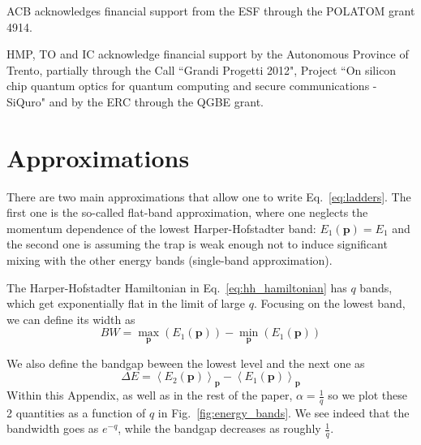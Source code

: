 \documentclass[twocolumn, 10pt, aps, superscriptaddress, floatfix, showpacs, pra, citeautoscript]{revtex4-1}
\newcommand{\vt}[1]{\mathbf{#1}}
\newcommand{\co}[2]{#2}
\renewcommand{\paragraph}{\co}
\begin{document}
\acknowledgments

ACB acknowledges financial support from the ESF through the POLATOM grant 4914.

HMP, TO and IC acknowledge financial support by the Autonomous Province of Trento, partially through the Call ``Grandi Progetti 2012", Project ``On silicon chip quantum optics for quantum computing and secure communications - SiQuro" and by the ERC through the QGBE grant.





\appendix

\section{Approximations}\label{app:approximations}


\paragraph{There are two main approximations in Hannah's paper.}
There are two main approximations that allow one to write
Eq.~\eqref{eq:ladders}. The first one is the so-called flat-band
approximation, where one neglects the momentum dependence of the
lowest Harper-Hofstadter band: $E_1(\vt{p}) = E_1$ and the second one is
assuming the trap is weak enough not to induce significant mixing with
the other energy bands (single-band approximation).

The Harper-Hofstadter Hamiltonian in Eq.~\eqref{eq:hh_hamiltonian} has
$q$ bands, which get exponentially flat in the limit of large
$q$. Focusing on the lowest band, we can define its width as
\begin{equation}
 BW = \max_{\vt{p}}(E_1(\vt{p})) - \min_{\vt{p}}(E_1(\vt{p})) 
\end{equation}

\paragraph{The scaling of bandwidth and bandgap with q is different.}
We also define the bandgap beween the lowest level and the next one as
\begin{equation}
  \Delta E = \left<E_2(\vt{p})\right>_{\vt{p}} - \left<E_1(\vt{p})\right>_{\vt{p}}
\end{equation}
Within this Appendix, as well as in the rest of the paper,
$\alpha=\frac{1}{q}$ so we plot these 2 quantities as a function of
$q$ in Fig.~\ref{fig:energy_bands}. We see indeed that the bandwidth
goes as $e^{-q}$, while the bandgap decreases as roughly
$\frac{1}{q}$.
\end{document}

